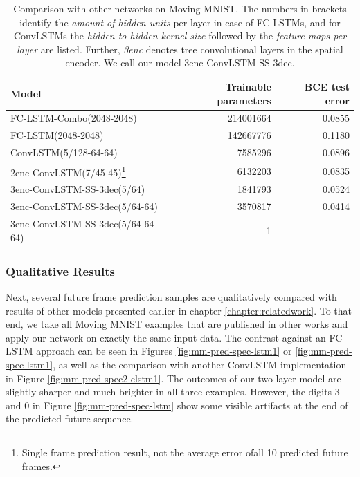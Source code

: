 \begin{table}[htb]
  \small
  \centering
  \begin{tabular}{l r r}
    \toprule
      \textbf{Model} & \textbf{Trainable parameters} & \textbf{BCE test error} \\
    \midrule
      FC-LSTM-Combo(2048-2048) \tiny{\parencite{unsup_learn_lstm}} & \num{214001664} & 0.0855 \\
      FC-LSTM(2048-2048) \tiny{\parencite{conv_lstm_nowcasting}} & \num{142667776} & 0.1180 \\
      ConvLSTM(5/128-64-64) \tiny{\parencite{conv_lstm_nowcasting}} & \num{7585296} & 0.0896 \\
      2enc-ConvLSTM(7/45-45)\footnote{Single frame prediction result, not the average error ofall 10 predicted future frames.} \tiny{\parencite{spat_temp_video_autoenc}} & \num{6132203} & 0.0835 \\
    \midrule
      3enc-ConvLSTM-SS-3dec(5/64) & \num{1841793} & 0.0524 \\
      3enc-ConvLSTM-SS-3dec(5/64-64) & \num{3570817} & 0.0414 \\
      3enc-ConvLSTM-SS-3dec(5/64-64-64) & \num{1} & \\ %
    \bottomrule
  \end{tabular}
  \caption[Result Comparison on Moving MNIST]{Comparison with other networks on Moving MNIST. The numbers in brackets identify the \textit{amount of hidden units} per layer in case of FC-LSTMs, and for ConvLSTMs the \textit{hidden-to-hidden kernel size} followed by the \textit{feature maps per layer} are listed. Further, \textit{3enc} denotes tree convolutional layers in the spatial encoder. We call our model 3enc-ConvLSTM-SS-3dec.}\label{tab:mm-comparison}
\end{table}

\subsubsection{Qualitative Results}

Next, several future frame prediction samples are qualitatively compared with results of other models presented earlier in chapter \ref{chapter:relatedwork}. To that end, we take all Moving MNIST examples that are published in other works and apply our network on exactly the same input data. The contrast against an FC-LSTM approach can be seen in Figures \ref{fig:mm-pred-spec-lstm1} or \ref{fig:mm-pred-spec-lstm1}, as well as the comparison with another ConvLSTM implementation in Figure \ref{fig:mm-pred-spec2-clstm1}. The outcomes of our two-layer model are slightly sharper and much brighter in all three examples. However, the digits \num{3} and \num{0} in Figure \ref{fig:mm-pred-spec-lstm} show some visible artifacts at the end of the predicted future sequence.

